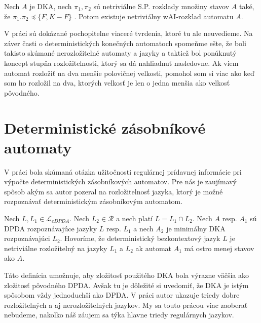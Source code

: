 \begin{theorem}
Nech $ A $ je DKA, nech $ \pi_1,\pi_2 $ sú netriviálne S.P. rozklady množiny stavov $ A $ také, že $ \pi_1.\pi_2 \preceq \lbrace F, K-F \rbrace $ . Potom existuje netriviálny wAI-rozklad automatu $ A $.
\end{theorem}

V práci sú dokázané pochopitelne viaceré tvrdenia, ktoré tu ale neuvedieme. Na záver časti o deterministických konečných automatoch spomeňme ešte, že boli takisto skúmané nerozložitelné automaty a jazyky a taktiež bol ponúknutý koncept stupňa rozložitelnosti, ktorý sa dá nahliadnuť nasledovne. Ak viem automat rozložiť na dva menšie polovičnej velkosti, pomohol som si viac ako keď som ho rozložil na dva, ktorých velkosť je len o jedna menšia ako velkosť pôvodného.

\section{Deterministické zásobníkové automaty}
V práci \cite{Labath} bola skúmaná otázka užitočnosti regulárnej prídavnej informácie pri výpočte deterministických zásobníkových automatov. Pre nás je zaujímavý spôsob akým sa autor pozeral na rozložitelnosť jazyka, ktorý je možné rozpoznávať deterministickým zásobníkovým automatom.

\begin{definition}
Nech $ L,L_1 \in  \mathscr{L}_{eDPDA}$. Nech $ L_2 \in \mathscr{R}$ a nech platí $ L = L_1 \cap L_2 $. Nech $ A $ resp. $ A_1 $ sú DPDA rozpoznávajúce jazyky $ L $ resp. $ L_1 $ a nech $ A_2 $ je minimálny DKA rozpoznávajúci $ L_2 $. Hovoríme, že deterministický bezkontextový jazyk $ L $ je netriviálne rozložitelný na jazyky $ L_1 $ a $ L_2 $ ak automat $ A_1 $ má ostro menej stavov ako $ A $.
\end{definition}

Táto definícia umožnuje, aby zložitosť použitého DKA bola výrazne väčšia ako zložitosť pôvodného DPDA. Avšak tu je dôležité si uvedomiť, že DKA je istým spôsobom vždy jednoduchší ako DPDA. V práci autor ukazuje triedy dobre rozložitelných a aj nerozložitelných jazykov. My sa touto prácou viac zaoberať nebudeme, nakolko náš záujem sa týka hlavne triedy regulárnych jazykov.